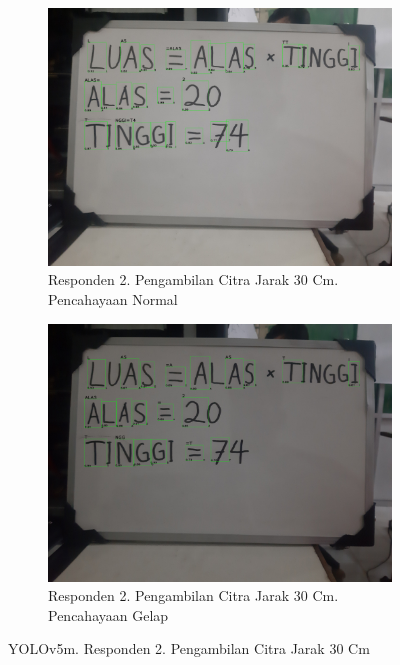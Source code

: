 \begin{figure}[H]
  \begin{subfigure}{.5\textwidth}
    \centering
    \captionsetup{width=.8\linewidth}
    \includegraphics[width=.8\linewidth]{gambar/yolov5m/responden2/ghiyas30cm00-result.jpg}
    \caption{Responden 2. Pengambilan Citra Jarak 30 Cm. Pencahayaan Normal}
    \label{fig:mr2tcitra30cm}
  \end{subfigure}%
  \begin{subfigure}{.5\textwidth}
    \centering
    \captionsetup{width=.8\linewidth}
    \includegraphics[width=.8\linewidth]{gambar/yolov5m/responden2/ghiyas30cm10-result.jpg}
    \caption{Responden 2. Pengambilan Citra Jarak 30 Cm. Pencahayaan Gelap}
    \label{fig:mr2gcitra30cm}
  \end{subfigure}
  \caption{YOLOv5m. Responden 2. Pengambilan Citra Jarak 30 Cm}
  \label{fig:mr2citra30cm}
\end{figure}

